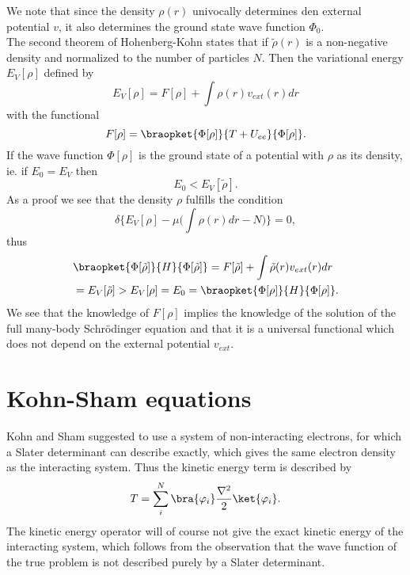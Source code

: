 \documentclass[a4paper,10pt,english]{article}%
\begin{document}
We note that since the density $\rho(r)$ univocally determines den external potential $v$, it also determines the ground state wave function $\Phi_0$.\\

The second theorem of Hohenberg-Kohn states that if $\tilde \rho(r)$ is a non-negative density and normalized to the number of particles $N$. Then the 
variational energy $E_V[\rho]$ defined by
\begin{equation}
  E_V[\rho]=F[\rho]+\int\rho(r)v_{ext}(r)dr
  \label{s1eq:energyv}
\end{equation}
with the functional 
\begin{equation}
  F[\rho]=\braopket{\Phi[\rho]}{T+U_{ee}}{\Phi[\rho]}.
  \label{s1eq:Fu}
\end{equation}
If the wave function $\Phi[\rho]$ is the ground state of a potential with $\rho$ as its density, ie. if $E_0=E_V$ then 
\begin{equation*}
  E_0 < E_V[\tilde \rho].
\end{equation*} 
As a proof we see that the density $\rho$ fulfills the condition 
\begin{equation}
  \delta\big\{E_V[\rho]-\mu\big(\int\rho(r)dr-N\big)\big\}=0,
  \label{s1eq:variationl}
\end{equation}
thus 
\begin{equation}
  \begin{split}
	&\braopket{\Phi[\tilde \rho]}{H}{\Phi[\tilde \rho]}=F[\tilde \rho]+\int\tilde \rho(r)v_{ext}(r)dr\\
	&=E_{V}[\tilde \rho]>E_V[\rho]=E_0=\braopket{\Phi[\rho]}{H}{\Phi[\rho]}.
  \end{split}
  \label{s1eq:proof2}
\end{equation}
We see that the knowledge of $F[\rho]$ implies the knowledge of the solution of
the full many-body Schr\"odinger equation and that it is a universal functional
which does not depend on the external potential $v_{ext}$.

\section{Kohn-Sham equations}

Kohn and Sham \cite{Kohn1965}  suggested to use a system of non-interacting electrons, 
for which a Slater determinant can describe exactly, which gives the same
electron density as the interacting system. Thus the kinetic energy term is described by 
\begin{equation}
  T=\sum_i^N \bra{\varphi_i}\frac{\nabla^2}{2}\ket{\varphi_i}.
  \label{s2ksT}
\end{equation}
The kinetic energy operator will of course not give the exact kinetic energy of
the interacting system, which follows from the observation that the wave function
of the true problem is not described purely by a Slater determinant.\\
\end{document}

